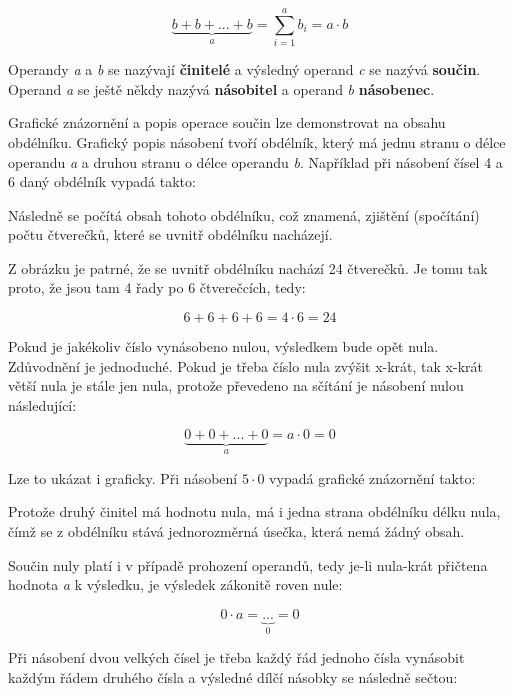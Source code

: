 $$\underbrace {b + b + ... +b}_a = \sum^a_{i=1} b_i = a \cdot b $$

Operandy {\it a} a {\it b} se nazývají {\bf činitelé} a výsledný operand {\it c} se nazývá {\bf součin}. Operand {\it a} se ještě někdy nazývá {\bf násobitel} a operand {\it b} {\bf násobenec}.


Grafické znázornění a popis operace součin lze demonstrovat na obsahu obdélníku. Grafický popis násobení tvoří obdélník, který má jednu stranu  o délce operandu {\it a} a druhou stranu o délce operandu {\it b}. Například při násobení čísel 4 a 6 daný obdélník vypadá takto:

\vskip 4mm
\centerline{}
\vskip 4mm

Následně se počítá obsah tohoto obdélníku, což znamená, zjištění (spočítání) počtu čtverečků, které se uvnitř obdélníku nacházejí.

\vskip 4mm
\centerline{}
\vskip 4mm

Z obrázku je patrné, že se uvnitř obdélníku nachází 24 čtverečků. Je tomu tak proto, že jsou tam 4 řady po 6 čtverečcích, tedy:

$$6+6+6+6 = 4\cdot 6 = 24$$


Pokud je jakékoliv číslo vynásobeno nulou, výsledkem bude opět nula. Zdůvodnění je jednoduché. Pokud je třeba číslo nula zvýšit x-krát, tak x-krát větší nula je stále jen nula, protože převedeno na sčítání je násobení nulou následující:

$$ \underbrace{0+0+...+0}_a = a\cdot 0 = 0 $$

Lze to ukázat i graficky. Při násobení $5 \cdot 0$ vypadá grafické znázornění takto:

\vskip 4mm
\centerline{}
\vskip 4mm


Protože druhý činitel má hodnotu nula, má i jedna strana obdélníku délku nula, čímž se z obdélníku stává jednorozměrná úsečka, která nemá žádný obsah.

Součin nuly platí i v  případě prohození operandů, tedy je-li nula-krát přičtena hodnota {\it a} k výsledku, je výsledek zákonitě roven nule:

$$0 \cdot a = \underbrace {...}_0 = 0$$


Při násobení dvou velkých čísel je třeba každý řád jednoho čísla vynásobit každým řádem druhého čísla a výsledné dílčí násobky se následně sečtou:

